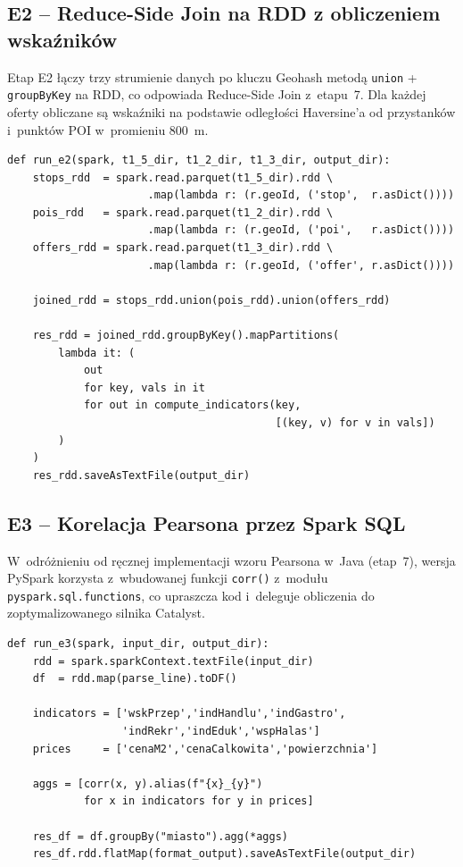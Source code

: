 \documentclass{labreport}
\begin{document}
\subsection{E2 -- Reduce-Side Join na RDD z obliczeniem wskaźników}

Etap E2 łączy trzy strumienie danych po kluczu Geohash metodą \texttt{union} + \texttt{groupByKey} na RDD, co odpowiada Reduce-Side Join z~etapu~7. Dla każdej oferty obliczane są wskaźniki na podstawie odległości Haversine'a od przystanków i~punktów POI w~promieniu 800~m.

\begin{verbatim}
def run_e2(spark, t1_5_dir, t1_2_dir, t1_3_dir, output_dir):
    stops_rdd  = spark.read.parquet(t1_5_dir).rdd \
                      .map(lambda r: (r.geoId, ('stop',  r.asDict())))
    pois_rdd   = spark.read.parquet(t1_2_dir).rdd \
                      .map(lambda r: (r.geoId, ('poi',   r.asDict())))
    offers_rdd = spark.read.parquet(t1_3_dir).rdd \
                      .map(lambda r: (r.geoId, ('offer', r.asDict())))

    joined_rdd = stops_rdd.union(pois_rdd).union(offers_rdd)

    res_rdd = joined_rdd.groupByKey().mapPartitions(
        lambda it: (
            out
            for key, vals in it
            for out in compute_indicators(key,
                                          [(key, v) for v in vals])
        )
    )
    res_rdd.saveAsTextFile(output_dir)
\end{verbatim}

\subsection{E3 -- Korelacja Pearsona przez Spark SQL}

W~odróżnieniu od ręcznej implementacji wzoru Pearsona w~Java (etap~7), wersja PySpark korzysta z~wbudowanej funkcji \texttt{corr()} z~modułu \texttt{pyspark.sql.functions}, co upraszcza kod i~deleguje obliczenia do zoptymalizowanego silnika Catalyst.

\begin{verbatim}
def run_e3(spark, input_dir, output_dir):
    rdd = spark.sparkContext.textFile(input_dir)
    df  = rdd.map(parse_line).toDF()

    indicators = ['wskPrzep','indHandlu','indGastro',
                  'indRekr','indEduk','wspHalas']
    prices     = ['cenaM2','cenaCalkowita','powierzchnia']

    aggs = [corr(x, y).alias(f"{x}_{y}")
            for x in indicators for y in prices]

    res_df = df.groupBy("miasto").agg(*aggs)
    res_df.rdd.flatMap(format_output).saveAsTextFile(output_dir)
\end{verbatim}
\end{document}
